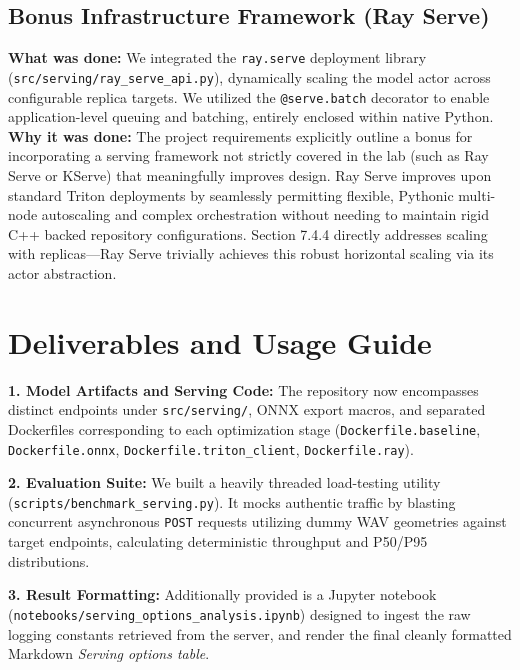 \documentclass{article}
\begin{document}
\subsection{Bonus Infrastructure Framework (Ray Serve)}
\textbf{What was done:} We integrated the \texttt{ray.serve} deployment library (\texttt{src/serving/ray\_serve\_api.py}), dynamically scaling the model actor across configurable replica targets. We utilized the \texttt{@serve.batch} decorator to enable application-level queuing and batching, entirely enclosed within native Python. 
\newline
\textbf{Why it was done:} The project requirements explicitly outline a bonus for incorporating a serving framework not strictly covered in the lab (such as Ray Serve or KServe) that meaningfully improves design. Ray Serve improves upon standard Triton deployments by seamlessly permitting flexible, Pythonic multi-node autoscaling and complex orchestration without needing to maintain rigid C++ backed repository configurations. Section 7.4.4 directly addresses scaling with replicas---Ray Serve trivially achieves this robust horizontal scaling via its actor abstraction.

\section{Deliverables and Usage Guide}

\textbf{1. Model Artifacts and Serving Code:} The repository now encompasses distinct endpoints under \texttt{src/serving/}, ONNX export macros, and separated Dockerfiles corresponding to each optimization stage (\texttt{Dockerfile.baseline}, \texttt{Dockerfile.onnx}, \texttt{Dockerfile.triton\_client}, \texttt{Dockerfile.ray}).

\textbf{2. Evaluation Suite:} We built a heavily threaded load-testing utility (\texttt{scripts/benchmark\_serving.py}). It mocks authentic traffic by blasting concurrent asynchronous \texttt{POST} requests utilizing dummy WAV geometries against target endpoints, calculating deterministic throughput and P50/P95 distributions.

\textbf{3. Result Formatting:} Additionally provided is a Jupyter notebook (\texttt{notebooks/serving\_options\_analysis.ipynb}) designed to ingest the raw logging constants retrieved from the server, and render the final cleanly formatted Markdown \textit{Serving options table}.
\end{document}
